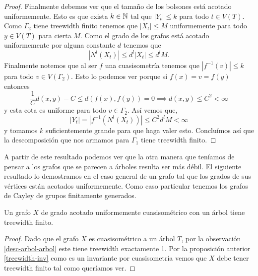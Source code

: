 \documentclass[tesis.tex]{subfiles}
\begin{document}
\begin{proof}
	Finalmente debemos ver que el tamaño de los bolsones está acotado uniformemente.
	Esto es que exista $k \in \mathbb{N}$ tal que $|Y_t| \le k$ para todo $t \in V(T)$.
	Como $\Gamma_2$ tiene treewidth finito tenemos que $|X_t| \le M$ uniformemente para todo $y \in V(T)$ para cierta $M$. 
	Como el grado de los grafos está acotado uniformemente por alguna constante $d$ tenemos que 
	\[
	|N^l(X_t)| \le d^l |X_t| \le d^l M.
	\]
	Finalmente notemos que al ser $f$ una cuasisometría tenemos que $|f^{-1}(v)| \le k$ para todo $v \in V(\Gamma_2)$.
	Esto lo podemos ver porque si $f(x) = v = f(y)$ entonces
	\[
	\frac{1}{C}d(x,y) - C \le d( f(x), f(y) ) = 0 \implies d(x,y) \le C^2 < \infty
	\]
	y esta cota es uniforme para todo $v \in \Gamma_2$. 
	Así vemos que,
	\[
	|Y_t| = |f^{-1}(N^l(X_t))| \le C^2 d^l M < \infty
	\]
	y tomamos $k$ suficientemente grande para que haga valer esto.
	Concluímos así que la descomposición que nos armamos para $\Gamma_1$ tiene treewidth finito.
\end{proof}

A partir de este resultado podemos ver que la otra manera que teníamos de pensar a los grafos que se parecen a árboles resulta ser más débil. 
El siguiente resultado lo demostramos en el caso general de un grafo tal que los grados de sus vértices están acotados uniformemente. 
Como caso particular tenemos los grafos de Cayley de grupos finitamente generados.


\begin{prop} 
	Un grafo $X$ de grado acotado uniformemente cuasisométrico con un árbol tiene treewidth finito.
\end{prop}
\begin{proof}	
%
Dado que el grafo $X$ es cuasisométrico a un árbol $T$, por la observación \ref{desc-arbol-arbol} este tiene treewidth exactamente 1.
Por la proposición anterior \ref{treewidth-inv} como es un invariante por cuasisometría vemos que $X$ debe tener treewidth finito tal como queríamos ver.
\end{proof}
\end{document}
